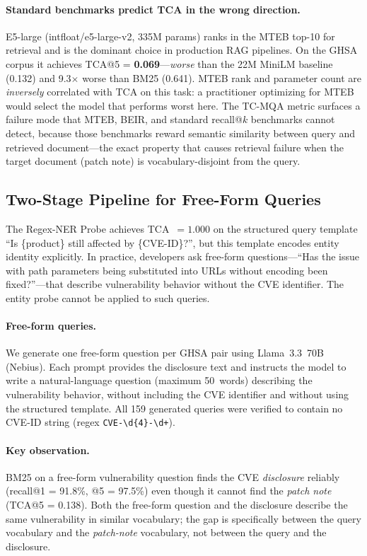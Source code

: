 \documentclass[11pt]{article}
\begin{document}
\paragraph{Standard benchmarks predict TCA in the wrong direction.}
E5-large (intfloat/e5-large-v2, 335M params) ranks in the MTEB top-10 for retrieval and is the dominant choice in production RAG pipelines. On the GHSA corpus it achieves TCA@5 = \textbf{0.069}---\emph{worse} than the 22M MiniLM baseline (0.132) and 9.3$\times$ worse than BM25 (0.641). MTEB rank and parameter count are \emph{inversely} correlated with TCA on this task: a practitioner optimizing for MTEB would select the model that performs worst here. The TC-MQA metric surfaces a failure mode that MTEB, BEIR, and standard recall@$k$ benchmarks cannot detect, because those benchmarks reward semantic similarity between query and retrieved document---the exact property that causes retrieval failure when the target document (patch note) is vocabulary-disjoint from the query.

\subsection{Two-Stage Pipeline for Free-Form Queries}
\label{sec:twostage}

The Regex-NER Probe achieves TCA~$= 1.000$ on the structured query template ``Is \{product\} still affected by \{CVE-ID\}?'', but this template encodes entity identity explicitly. In practice, developers ask free-form questions---``Has the issue with path parameters being substituted into URLs without encoding been fixed?''---that describe vulnerability behavior without the CVE identifier. The entity probe cannot be applied to such queries.

\paragraph{Free-form queries.} We generate one free-form question per GHSA pair using Llama~3.3~70B (Nebius). Each prompt provides the disclosure text and instructs the model to write a natural-language question (maximum 50~words) describing the vulnerability behavior, without including the CVE identifier and without using the structured template. All 159 generated queries were verified to contain no CVE-ID string (regex \texttt{CVE-\textbackslash d\{4\}-\textbackslash d+}).

\paragraph{Key observation.} BM25 on a free-form vulnerability question finds the CVE \emph{disclosure} reliably (recall@1 = 91.8\%, @5 = 97.5\%) even though it cannot find the \emph{patch note} (TCA@5 = 0.138). Both the free-form question and the disclosure describe the same vulnerability in similar vocabulary; the gap is specifically between the query vocabulary and the \emph{patch-note} vocabulary, not between the query and the disclosure.
\end{document}
